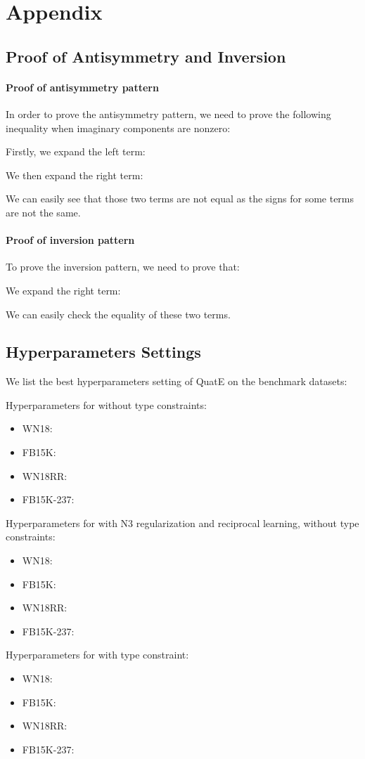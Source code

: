 \documentclass{article}
\begin{document}



\newpage

\section{Appendix}

\subsection{Proof of Antisymmetry and Inversion}
\paragraph{Proof of antisymmetry pattern} In order to prove the antisymmetry pattern, we need to prove the following inequality when imaginary components are nonzero:

Firstly, we expand the left term:


We then expand the right term:

We can easily see that those two terms are not equal as the signs for some terms are not the same.

\paragraph{Proof of inversion pattern} To prove the inversion pattern, we need to prove that:

We expand the right term:

We can easily check the equality of these two terms.

\subsection{Hyperparameters Settings}
We list the best hyperparameters setting of QuatE on the benchmark datasets:

Hyperparameters for  without type constraints:
\begin{itemize}
    \item WN18: 
    \item FB15K: 
    \item WN18RR: 
    \item FB15K-237: 
\end{itemize}
Hyperparameters for  with N3 regularization and reciprocal learning, without type constraints:
\begin{itemize}
    \item WN18: 
    \item FB15K: 
    \item WN18RR: 
    \item FB15K-237: 
\end{itemize}
Hyperparameters for  with type constraint:
\begin{itemize}
    \item WN18: 
    \item FB15K: 
    \item WN18RR: 
    \item FB15K-237: 
\end{itemize}
\end{document}
